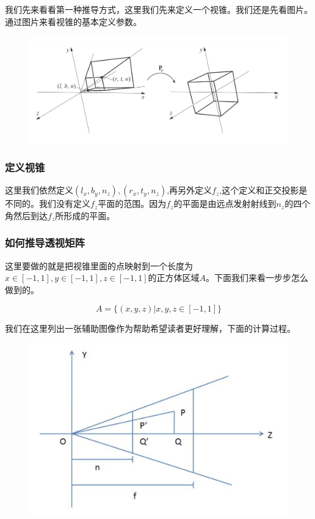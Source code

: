 \documentclass{article} \usepackage{braket} \usepackage{amsmath,amssymb} \usepackage{geometry} \usepackage{graphicx} \usepackage{braket} \usepackage{bm}\usepackage{hyperref} \usepackage{CJKutf8}
\begin{document}
\begin{CJK}{UTF8}{gbsn}
  我们先来看看第一种推导方式，这里我们先来定义一个视锥。我们还是先看图片。通过图片来看视锥的基本定义参数。

  \begin{figure}[htbp]
    \centering
    \includegraphics[width=1.0\linewidth]{pic-4.jpg}
  \end{figure}

  \subsubsection{定义视锥}

  这里我们依然定义$(l_x,b_y,n_z), (r_x,t_y,n_z)$,再另外定义$f_z$,这个定义和正交投影是不同的。我们没有定义$f_z$平面的范围。因为$f_z$的平面是由远点发射射线到$n_z$的四个角然后到达$f_z$所形成的平面。

  \subsubsection{如何推导透视矩阵}

  这里要做的就是把视锥里面的点映射到一个长度为$x\in[-1,1],y\in[-1, 1], z\in [-1,1]$的正方体区域$A$。下面我们来看一步步怎么做到的。
  
  \begin{equation}
    \label{eq:volume}
    A=\{(x,y,z)|x,y,z\in [-1,1]\}
  \end{equation}

  我们在这里列出一张辅助图像作为帮助希望读者更好理解，下面的计算过程。

  \begin{figure}[htbp]
    \centering
    \includegraphics[width=0.8\linewidth]{pic-5.jpg}
  \end{figure}	


\end{CJK}
\end{document}
